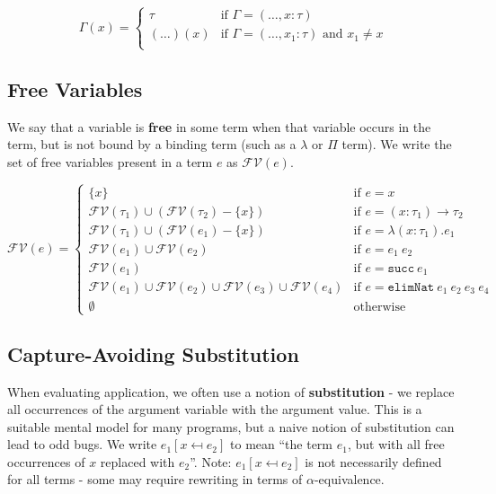 \documentclass[12pt]{article}
\begin{document}
\begin{equation*}
\Gamma(x) = \begin{cases}
\tau       & \text{if } \Gamma = (\dots, x : \tau) \\
(\dots)(x) & \text{if } \Gamma = (\dots, x_1 : \tau) \text{ and } x_1 \neq x \\
\end{cases}
\end{equation*}

\subsection*{Free Variables}
\label{sec:orgc030710}

We say that a variable is \textbf{free} in some term when that variable occurs in the term, but is not bound by a binding term (such as a \(\lambda\) or \(\Pi\) term). We write the set of free variables present in a term \(e\) as \(\mathcal{FV}(e)\).

\begin{equation*}
\mathcal{FV}(e) = \begin{cases}
\{ x \}   & \text{if } e = x \\
\mathcal{FV}(\tau_1) \cup (\mathcal{FV}(\tau_2) - \{ x \})
  &\text{if } e = (x : \tau_1) \rightarrow \tau_2 \\
\mathcal{FV}(\tau_1) \cup (\mathcal{FV}(e_1) - \{ x \})
  &\text{if } e = \lambda (x : \tau_1). e_1 \\
\mathcal{FV}(e_1) \cup \mathcal{FV}(e_2)
  &\text{if } e = e_1\ e_2 \\
\mathcal{FV}(e_1) 
  &\text{if } e = \mathtt{succ}\ e_1 \\
\mathcal{FV}(e_1)
  \cup \mathcal{FV}(e_2)
  \cup \mathcal{FV}(e_3)
  \cup \mathcal{FV}(e_4)
  &\text{if } e = \mathtt{elimNat}\ e_1\ e_2\ e_3\ e_4 \\
\emptyset & \text{otherwise}
\end{cases}
\end{equation*}

\subsection*{Capture-Avoiding Substitution}
\label{sec:orgab62c4a}

When evaluating application, we often use a notion of \textbf{substitution} - we replace all occurrences of the argument variable with the argument value. This is a suitable mental model for many programs, but a naive notion of substitution can lead to odd bugs. We write \(e_1[x \mapsfrom{} e_2]\) to mean ``the term \(e_1\), but with all free occurrences of \(x\) replaced with \(e_2\)''. Note: \(e_1 [ x \mapsfrom e_2 ]\) is not necessarily defined for all terms - some may require rewriting in terms of \(\alpha\)-equivalence.
\end{document}
